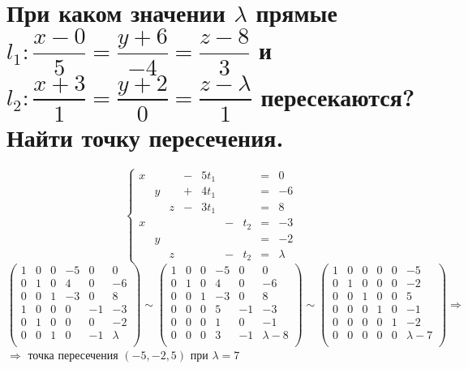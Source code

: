 \documentclass[12pt]{article}
\begin{document}
\begin{sloppypar}
    \section{При каком значении $\lambda$ прямые $l_1: \dfrac{x - 0}{5} = \dfrac{y + 6}{-4} = \dfrac{z - 8}{3}$ и $l_2: \dfrac{x + 3}{1} = \dfrac{y + 2}{0} = \dfrac{z - \lambda}{1}$ пересекаются? Найти точку пересечения.}
    \[
        \left\{\begin{array}{rcrcrcrcl}
            x &   &   & - & 5t_1 &   &     & = & 0       \\
              & y &   & + & 4t_1 &   &     & = & -6      \\
              &   & z & - & 3t_1 &   &     & = & 8       \\
            x &   &   &   &      & - & t_2 & = & -3      \\
              & y &   &   &      &   &     & = & -2      \\
              &   & z &   &      & - & t_2 & = & \lambda
        \end{array}\right.
    \]
    \[
        \left(\begin{array}{ccccc|c}
                1 & 0 & 0 & -5 & 0  & 0       \\
                0 & 1 & 0 & 4  & 0  & -6      \\
                0 & 0 & 1 & -3 & 0  & 8       \\
                1 & 0 & 0 & 0  & -1 & -3      \\
                0 & 1 & 0 & 0  & 0  & -2      \\
                0 & 0 & 1 & 0  & -1 & \lambda \\
            \end{array}\right)
        \sim
        \left(\begin{array}{ccccc|c}
                1 & 0 & 0 & -5 & 0  & 0           \\
                0 & 1 & 0 & 4  & 0  & -6          \\
                0 & 0 & 1 & -3 & 0  & 8           \\
                0 & 0 & 0 & 5  & -1 & -3          \\
                0 & 0 & 0 & 1  & 0  & -1          \\
                0 & 0 & 0 & 3  & -1 & \lambda - 8 \\
            \end{array}\right)
        \sim
        \left(\begin{array}{ccccc|c}
                1 & 0 & 0 & 0 & 0 & -5          \\
                0 & 1 & 0 & 0 & 0 & -2          \\
                0 & 0 & 1 & 0 & 0 & 5           \\
                0 & 0 & 0 & 1 & 0 & -1          \\
                0 & 0 & 0 & 0 & 1 & -2          \\
                0 & 0 & 0 & 0 & 0 & \lambda - 7 \\
            \end{array}\right)
        \Rightarrow
    \]
    $\Rightarrow$ точка пересечения $(-5, -2, 5)$ при $\lambda = 7$


\end{sloppypar}
\end{document}
